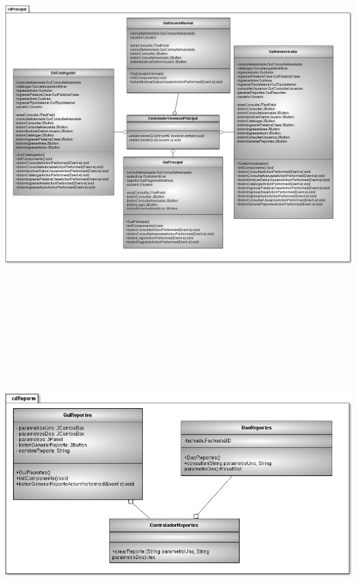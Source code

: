 \documentclass[11pt]{article}
\begin{document}
			\begin{minipage}[c]{1\linewidth}
				\centering
				\includegraphics[width=17cm, height=19cm]{DiagramasClase/PRINCIPAL}
			\end{minipage}
		
			\begin{minipage}[c]{1\linewidth}
				\centering
				\includegraphics[scale=0.5]{DiagramasClase/Reporte}
			\end{minipage} \\[5cm]
		
\end{document}
